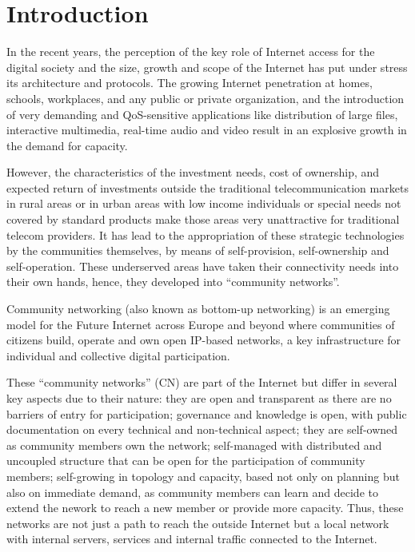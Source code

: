 \documentclass[conference]{IEEEtran}
\begin{document}
\section{Introduction}

In the recent years, the perception of the key role of Internet access for the
digital society and the size, growth and scope of the Internet has put under stress
its architecture and protocols. The growing Internet penetration at homes, schools,
workplaces, and any public or private organization, and the introduction of very demanding
and QoS-sensitive applications like distribution of large files, interactive multimedia,
real-time audio and video result in an explosive growth in the demand for capacity.

However, the characteristics of the investment needs, cost of ownership, and expected return
of investments outside the traditional telecommunication markets in rural areas or in 
urban areas with low income individuals or special needs not covered by standard products
make those areas very unattractive for traditional telecom providers. It has lead to the
appropriation of these strategic technologies by the communities themselves, by means of
self-provision, self-ownership and self-operation. These underserved areas have taken their
connectivity needs into their own hands, hence, they developed into ``community networks''.

Community networking (also known as bottom-up networking) is an emerging model 
for the Future Internet across Europe and beyond where communities
of citizens build, operate and own open IP-based networks, a key infrastructure
for individual and collective digital participation.

These ``community networks'' (CN) are part of the Internet but differ in several key
aspects due to their nature: they are open and transparent as there are no barriers of entry
for participation; governance and knowledge is open, with public documentation on
every technical and non-technical aspect; they are self-owned as community members
own the network; self-managed with distributed and uncoupled structure that can be open
for the participation of community members; self-growing in topology and capacity, based not only
on planning but also on immediate demand, as community members can learn and decide to extend the nework
to reach a new member or provide more capacity. Thus, these networks are not just
a path to reach the outside Internet but a local network with internal servers, services and
internal traffic connected to the Internet.
\end{document}
